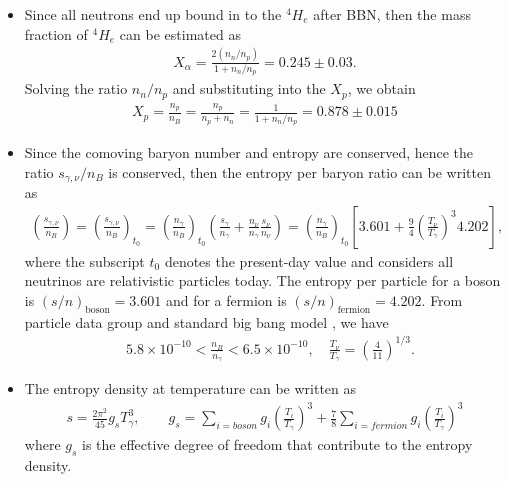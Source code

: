 \documentclass[universe,article,submit,moreauthors,pdftex,a4paper]{Definitions/mdpi}
\begin{document}
\begin{itemize}
  \item Since all neutrons end up bound in to the $^4H_e$ after BBN, then the mass fraction of $^4H_e$ can be estimated as \cite{ParticleDataGroup:2022pth}
\begin{align}
X_\alpha=\frac{2(n_n/n_p)}{1+n_n/n_p}=0.245\pm0.03.
\end{align} 
 Solving the ratio $n_n/n_p$ and substituting into the $X_p$, we obtain
\begin{align}
 X_p=\frac{n_p}{n_B}=\frac{n_p}{n_p+n_n}=\frac{1}{1+n_n/n_p}=0.878\pm0.015
\end{align}

  \item Since the comoving baryon number and entropy are conserved, hence the ratio $s_{\gamma,\nu}/n_B$ is conserved, then the entropy per baryon ratio can be written as
\begin{align}
\left(\frac{s_{\gamma,\nu}}{n_B}\right)=\left(\frac{s_{\gamma,\nu}}{n_B}\right)_{\!\!t_0}\!\!=\left(\frac{n_\gamma}{n_B}\right)_{\!\!t_0}\left(\frac{s_\gamma}{n_\gamma}+\frac{n_\nu}{n_\gamma}\frac{s_\nu}{n_\nu}\right)=\left(\frac{n_\gamma}{n_B}\right)_{\!\!t_0}\left[3.601+\frac{9}{4}\left(\frac{T_\nu}{T_\gamma}\right)^{\!\!3}4.202\right],
\end{align}
where the subscript $t_0$ denotes the present-day value and considers all neutrinos are relativistic particles today. The entropy per particle for a boson is $(s/n)_\mathrm{boson}=3.601$ and for a fermion is $(s/n)_\mathrm{fermion}=4.202$. From particle data group and standard big bang model \cite{ParticleDataGroup:2022pth,Kolb:1990vq}, we have
\begin{align}
&5.8\times10^{-10}<\frac{n_B}{n_\gamma}<6.5\times10^{-10},\quad\frac{T_\nu}{T_\gamma}=\left(\frac{4}{11}\right)^{1/3}.
\end{align}

  \item The entropy density at temperature can be written as \cite{Kolb:1990vq}
\begin{align}
s=\frac{2\pi^2}{45}g_sT_\gamma^3,\qquad g_s=\sum_{i=boson}g_i\left(\frac{T_i}{T_\gamma}\right)^3+\frac{7}{8}\sum_{i=fermion}g_i\left(\frac{T_i}{T_\gamma}\right)^3
\end{align}
where $g_s$ is the effective degree of freedom that contribute to the entropy density.  
\end{itemize}
 
\end{document}

